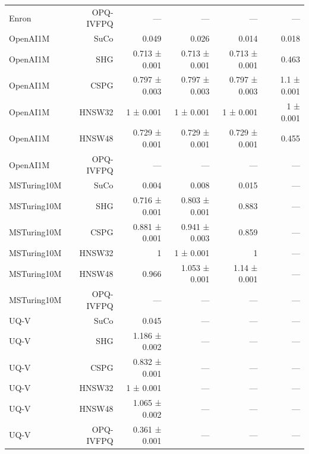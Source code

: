 \begin{table}[t]
\begin{tabular}{lrrrrr}
Enron & OPQ-IVFPQ & — & — & — & — \\
OpenAI1M & SuCo & 0.049 & 0.026 & 0.014 & 0.018 \\
OpenAI1M & SHG & 0.713 ± 0.001 & 0.713 ± 0.001 & 0.713 ± 0.001 & 0.463 \\
OpenAI1M & CSPG & 0.797 ± 0.003 & 0.797 ± 0.003 & 0.797 ± 0.003 & 1.1 ± 0.001 \\
OpenAI1M & HNSW32 & 1 ± 0.001 & 1 ± 0.001 & 1 ± 0.001 & 1 ± 0.001 \\
OpenAI1M & HNSW48 & 0.729 ± 0.001 & 0.729 ± 0.001 & 0.729 ± 0.001 & 0.455 \\
OpenAI1M & OPQ-IVFPQ & — & — & — & — \\
MSTuring10M & SuCo & 0.004 & 0.008 & 0.015 & — \\
MSTuring10M & SHG & 0.716 ± 0.001 & 0.803 ± 0.001 & 0.883 & — \\
MSTuring10M & CSPG & 0.881 ± 0.001 & 0.941 ± 0.003 & 0.859 & — \\
MSTuring10M & HNSW32 & 1 & 1 ± 0.001 & 1 & — \\
MSTuring10M & HNSW48 & 0.966 & 1.053 ± 0.001 & 1.14 ± 0.001 & — \\
MSTuring10M & OPQ-IVFPQ & — & — & — & — \\
UQ-V & SuCo & 0.045 & — & — & — \\
UQ-V & SHG & 1.186 ± 0.002 & — & — & — \\
UQ-V & CSPG & 0.832 ± 0.001 & — & — & — \\
UQ-V & HNSW32 & 1 ± 0.001 & — & — & — \\
UQ-V & HNSW48 & 1.065 ± 0.002 & — & — & — \\
UQ-V & OPQ-IVFPQ & 0.361 ± 0.001 & — & — & — \\
\bottomrule
\end{tabular}
\end{table}
